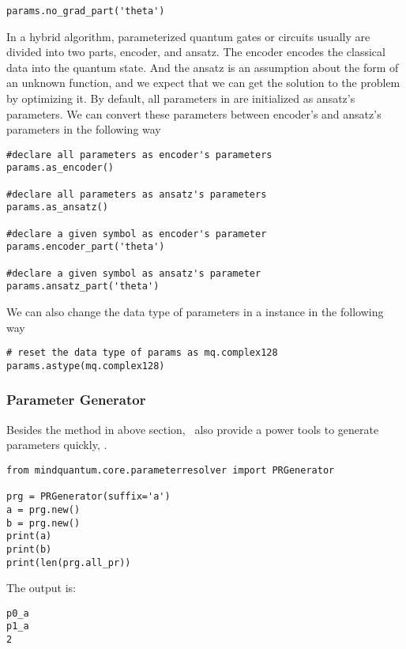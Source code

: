 \begin{lstlisting}
params.no_grad_part('theta')
\end{lstlisting}

In a hybrid algorithm, parameterized quantum gates or circuits usually are divided into two parts, encoder, and ansatz. The encoder encodes the classical data into the quantum state. And the ansatz is an assumption about the form of an unknown function, and we expect that we can get the solution to the problem by optimizing it. By default, all parameters in \ParameterResolver are initialized as ansatz's parameters. We can convert these parameters between encoder's and ansatz's parameters in the following way

\begin{lstlisting}
#declare all parameters as encoder's parameters
params.as_encoder()

#declare all parameters as ansatz's parameters
params.as_ansatz()

#declare a given symbol as encoder's parameter
params.encoder_part('theta')

#declare a given symbol as ansatz's parameter
params.ansatz_part('theta')
\end{lstlisting}

We can also change the data type of parameters in a \ParameterResolver instance in the following way
\begin{lstlisting}
# reset the data type of params as mq.complex128
params.astype(mq.complex128)
\end{lstlisting}

\subsubsection{Parameter Generator}

Besides the method in above section, \MindQuantum\ also provide a power tools to generate parameters quickly, \PRGenerator.
\begin{lstlisting}
from mindquantum.core.parameterresolver import PRGenerator

prg = PRGenerator(suffix='a')
a = prg.new()
b = prg.new()
print(a)
print(b)
print(len(prg.all_pr))
\end{lstlisting}
The output is:
\begin{lstlisting}
p0_a
p1_a
2
\end{lstlisting}
